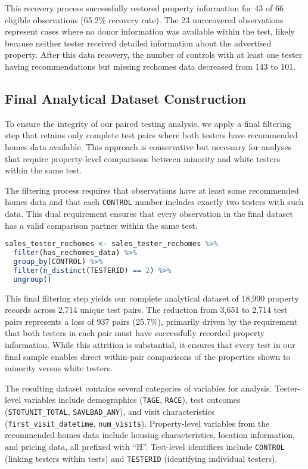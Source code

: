 \documentclass{article}
\begin{document}
This recovery process successfully restored property information for 43 of 66 eligible observations (65.2\% recovery rate). The 23 unrecovered observations represent cases where no donor information was available within the test, likely because neither tester received detailed information about the advertised property. After this data recovery, the number of controls with at least one tester having recommendations but missing rechomes data decreased from 143 to 101.

\subsection{Final Analytical Dataset Construction}

To ensure the integrity of our paired testing analysis, we apply a final filtering step that retains only complete test pairs where both testers have recommended homes data available. This approach is conservative but necessary for analyses that require property-level comparisons between minority and white testers within the same test.

The filtering process requires that observations have at least some recommended homes data and that each \texttt{CONTROL} number includes exactly two testers with such data. This dual requirement ensures that every observation in the final dataset has a valid comparison partner within the same test.

\begin{lstlisting}[language=R]
sales_tester_rechomes <- sales_tester_rechomes %>%
  filter(has_rechomes_data) %>%
  group_by(CONTROL) %>%
  filter(n_distinct(TESTERID) == 2) %>%
  ungroup()
\end{lstlisting}

This final filtering step yields our complete analytical dataset of 18,990 property records across 2,714 unique test pairs. The reduction from 3,651 to 2,714 test pairs represents a loss of 937 pairs (25.7\%), primarily driven by the requirement that both testers in each pair must have successfully recorded property information. While this attrition is substantial, it ensures that every test in our final sample enables direct within-pair comparisons of the properties shown to minority versus white testers.


The resulting dataset contains several categories of variables for analysis. Tester-level variables include demographics (\texttt{TAGE}, \texttt{RACE}), test outcomes (\texttt{STOTUNIT\_TOTAL}, \texttt{SAVLBAD\_ANY}), and visit characteristics (\texttt{first\_visit\_datetime}, \texttt{num\_visits}). Property-level variables from the recommended homes data include housing characteristics, location information, and pricing data, all prefixed with ``H''. Test-level identifiers include \texttt{CONTROL} (linking testers within tests) and \texttt{TESTERID} (identifying individual testers).
\end{document}
